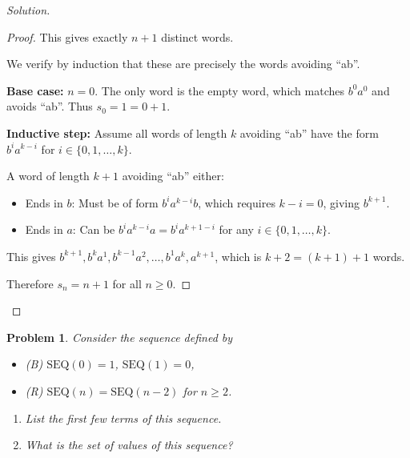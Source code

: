 \documentclass[12pt]{article}
\newtheorem{problem}{Problem}
\begin{document}
\begin{proof}[Solution]
\begin{enumerate}[label=(\alph*)]
\begin{proof}
    This gives exactly $n + 1$ distinct words.
    
    We verify by induction that these are precisely the words avoiding ``ab''.
    
    \textbf{Base case:} $n = 0$. The only word is the empty word, which matches $b^0a^0$ and avoids ``ab''. Thus $s_0 = 1 = 0 + 1$.
    
    \textbf{Inductive step:} Assume all words of length $k$ avoiding ``ab'' have the form $b^ia^{k-i}$ for $i \in \{0, 1, \ldots, k\}$.
    
    A word of length $k+1$ avoiding ``ab'' either:
    \begin{itemize}
        \item Ends in $b$: Must be of form $b^ia^{k-i}b$, which requires $k - i = 0$, giving $b^{k+1}$.
        \item Ends in $a$: Can be $b^ia^{k-i}a = b^ia^{k+1-i}$ for any $i \in \{0, 1, \ldots, k\}$.
    \end{itemize}
    
    This gives $b^{k+1}, b^ka^1, b^{k-1}a^2, \ldots, b^1a^k, a^{k+1}$, which is $k + 2 = (k+1) + 1$ words.
    
    Therefore $s_n = n + 1$ for all $n \geq 0$.
    \renewcommand{\qedsymbol}{}
    \end{proof}
\end{enumerate}
\end{proof}

\newpage

\setcounter{problem}{9}
\begin{problem}
Consider the sequence defined by
\begin{itemize}
    \item (B) $\text{SEQ}(0) = 1$, $\text{SEQ}(1) = 0$,
    \item (R) $\text{SEQ}(n) = \text{SEQ}(n-2)$ for $n \geq 2$.
\end{itemize}

\begin{enumerate}[label=(\alph*)]
    \item List the first few terms of this sequence.
    
    \item What is the set of values of this sequence?
\end{enumerate}
\end{problem}
\end{document}
